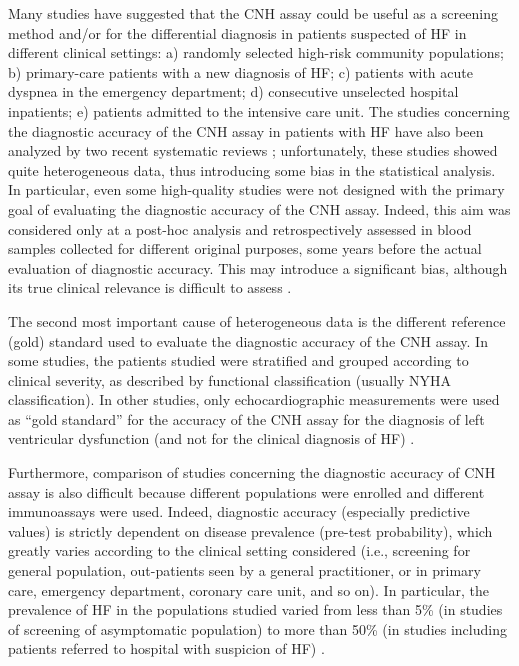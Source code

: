 \documentclass[14pt,a4paper,onecolumn]{extarticle}
\begin{document}
Many studies \citep{bib392} \citep{bib3108} \citep{bib3109} \citep{bib3110} \citep{bib3111} \citep{bib3112} \citep{bib3113} \citep{bib3114} \citep{bib3115} \citep{bib3116} \citep{bib3117} \citep{bib3118} \citep{bib3119} \citep{bib3120} \citep{bib3121} \citep{bib3121} \citep{bib3123} \citep{bib3124} \citep{bib3125} \citep{bib3126} \citep{bib3127} \citep{bib3128} have suggested that the CNH assay could be useful as a
screening method and/or for the differential diagnosis in patients suspected of HF in
different clinical settings: a) randomly selected high-risk community populations; b) primary-care patients with a new diagnosis of HF; c) patients with acute dyspnea in the
emergency department; d) consecutive unselected hospital inpatients; e) patients admitted to the intensive care unit.
The studies concerning the diagnostic accuracy of the CNH assay in patients with HF
have also been analyzed by two recent systematic reviews \citep{bib35} \citep{bib372}; unfortunately, these
studies showed quite heterogeneous data, thus introducing some bias in the statistical
analysis. In particular, even some high-quality studies were not designed with the primary goal of evaluating the diagnostic accuracy of the CNH assay. Indeed, this aim was
considered only at a post-hoc analysis and retrospectively assessed in blood samples collected for different original purposes, some years before the actual evaluation of diagnostic accuracy. This may introduce a significant bias, although its true clinical relevance is difficult to assess \citep{bib35}.

The second most important cause of heterogeneous data is the different reference
(gold) standard used to evaluate the diagnostic accuracy of the CNH assay. In some
studies, the patients studied were stratified and grouped according to clinical severity,
as described by functional classification (usually NYHA classification). In other studies, only echocardiographic measurements were used as “gold standard” for the accuracy of the CNH assay for the diagnosis of left ventricular dysfunction (and not for the
clinical diagnosis of HF) \citep{bib35} \citep{bib372}.

Furthermore, comparison of studies concerning the diagnostic accuracy of CNH
assay is also difficult because different populations were enrolled and different immunoassays were used. Indeed, diagnostic accuracy (especially predictive values) is strictly
dependent on disease prevalence (pre-test probability), which greatly varies according
to the clinical setting considered (i.e., screening for general population, out-patients
seen by a general practitioner, or in primary care, emergency department, coronary
care unit, and so on). In particular, the prevalence of HF in the populations studied varied from less than 5\% (in studies of screening of asymptomatic population) to more
than 50\% (in studies including patients referred to hospital with suspicion of HF) \citep{bib35}.
\end{document}
